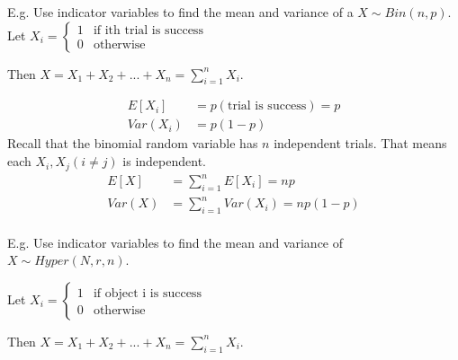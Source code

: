 \documentclass[12pt, letterpaper]{article}
\begin{document}
E.g. Use indicator variables to find the mean and variance of a $X \sim Bin(n, p)$.\\

Let $
X_i = \begin{cases}
1 & \text{if ith trial is success}\\
0 & \text{otherwise}
\end{cases}
$

Then $X = X_1 + X_2 + ... + X_n = \sum\limits_{i = 1}^{n} X_i$.

\begin{align*}
E[X_i] &= p\left(\text{trial is success}\right) = p\\
Var\left(X_i\right) &= p(1 - p)
\end{align*}
Recall that the binomial random variable has $n$ independent trials. That means each $X_i, X_j (i \neq j)$ is independent.
\begin{align*}
E[X] &= \sum_{i = 1}^{n} E[X_i] = np\\
Var\left(X\right) &= \sum_{i = 1}^{n} Var\left(X_i\right) = np(1 - p)
\end{align*}\\

E.g. Use indicator variables to find the mean and variance of $X \sim Hyper(N, r, n)$.

Let $
X_i = \begin{cases}
1 & \text{if object i is success}\\
0 & \text{otherwise}
\end{cases}
$

Then $X = X_1 + X_2 + ... + X_n = \sum\limits_{i = 1}^{n} X_i$.
\end{document}
